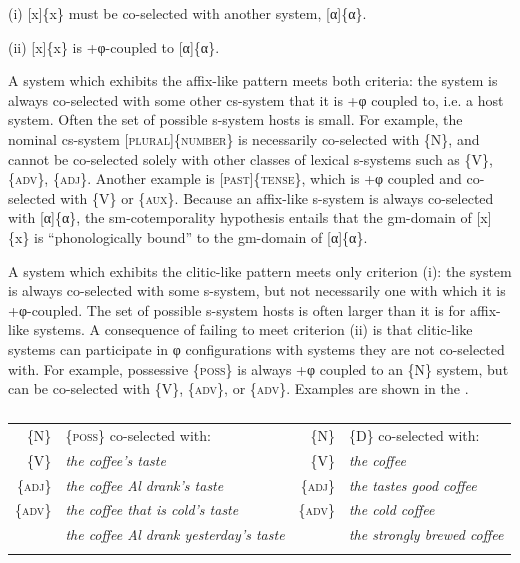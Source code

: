     (i)   [x]\{x\} must be co-selected with another system, [α]\{α\}.

    (ii)   [x]\{x\} is +φ-coupled to [α]\{α\}.

  A system which exhibits the affix-like pattern meets both criteria: the system is always co-selected with some other cs-system that it is +φ coupled to, i.e. a host system. Often the set of possible s-system hosts is small. For example, the nominal cs-system [\textsc{plural}]\{\textsc{number}\} is necessarily co-selected with \{N\}, and cannot be co-selected solely with other classes of lexical s-systems such as \{V\}, \{\textsc{adv}\}, \{\textsc{adj}\}. Another example is [\textsc{past}]\{\textsc{tense}\}, which is +φ coupled and co-selected with \{V\} or \{\textsc{aux}\}. Because an affix-like s-system is always co-selected with [α]\{α\}, the sm-cotemporality hypothesis entails that the gm-domain of [x]\{x\} is “phonologically bound” to the gm-domain of [α]\{α\}. 

  A system which exhibits the clitic-like pattern meets only criterion (i): the system is always co-selected with some s-system, but not necessarily one with which it is +φ-coupled. The set of possible s-system hosts is often larger than it is for affix-like systems. A consequence of failing to meet criterion (ii) is that clitic-like systems can participate in φ configurations with systems they are not co-selected with. For example, possessive \{\textsc{poss}\} is always +φ coupled to an \{N\} system, but can be co-selected with \{V\}, \{\textsc{adv}\}, or \{\textsc{adv}\}. Examples are shown in the {\tablebelow}.

\begin{table}
\begin{tabularx}{\textwidth}{rQrQ}
\lsptoprule                                                                                                                                                                      
 \{N\} &                    \{\textsc{poss}\} co-selected with:               &        \{N\}&                  \{\textsc{D}\} co-selected with:                                 \\
 \{V\}&                     \textit{the coffee’s taste}                       &        \{V\}&                  \textit{the coffee}                                              \\
 \{\textsc{adj}\}&          \textit{the coffee Al drank’s taste}              &        \{\textsc{adj}\}&       \textit{the tastes good coffee}                                  \\
 \{\textsc{adv}\} &            \textit{the coffee that is cold’s taste}       &           \{\textsc{adv}\} &         \textit{the cold coffee}                                   \\
                &             \textit{the coffee Al drank yesterday’s taste} &                                       &         \textit{the strongly brewed coffee}\\
\lspbottomrule
\end{tabularx}
\caption{\missingcaption}\label{tab:4:1}
\end{table} 

